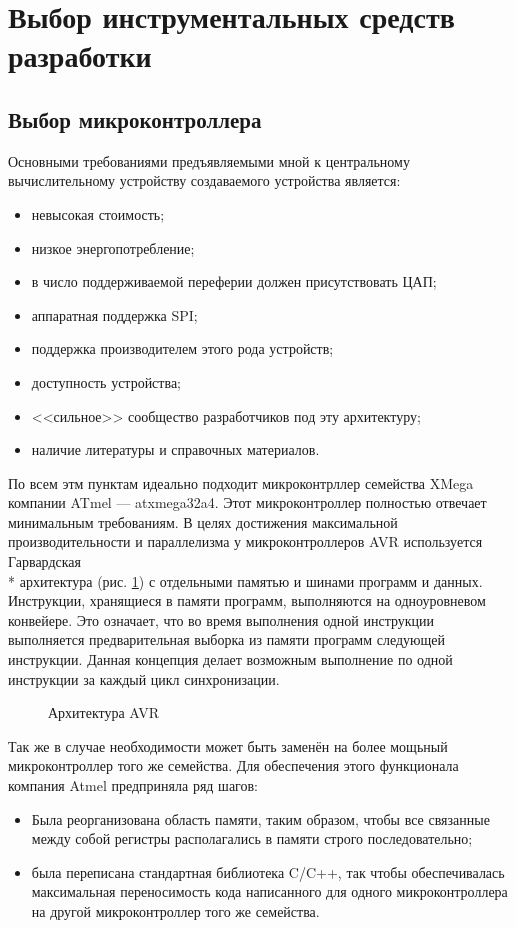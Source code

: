 \section{Выбор инструментальных средств разработки}

\subsection{Выбор микроконтроллера}
Основными требованиями предъявляемыми мной к центральному вычислительному устройству
создаваемого устройства является:
\begin{itemize}
	\item{} невысокая стоимость;
	\item{} низкое энергопотребление;
	\item{} в число поддерживаемой переферии должен присутствовать ЦАП;
	\item{} аппаратная поддержка SPI;
	\item{} поддержка производителем этого рода устройств;
	\item{} доступность устройства;
	\item{} <<сильное>> сообщество разработчиков под эту архитектуру;
	\item{} наличие литературы и справочных материалов.
\end{itemize}


По всем этм пунктам идеально подходит микроконтрллер семейства XMega компании ATmel --- atxmega32a4.
Этот микроконтроллер полностью отвечает минимальным требованиям. В целях достижения максимальной
производительности и параллелизма у микроконтроллеров AVR используется
Гарвардская\\*
архитектура (рис. \ref{img:avr_arch}) с отдельными памятью и шинами программ и данных. Инструкции,
хранящиеся в памяти программ, выполняются на одноуровневом конвейере. Это означает, что
во время выполнения одной инструкции выполняется предварительная выборка из памяти программ
следующей инструкции. Данная концепция делает возможным выполнение по одной инструкции за
каждый цикл синхронизации.

\begin{figure}[ht]
	\caption{Архитектура AVR}
	\label{img:avr_arch}
\end{figure}


Так же в случае необходимости может быть заменён на более мощьный микроконтроллер того же семейства.
Для обеспечения этого функционала компания Atmel предприняла ряд шагов:
\begin{itemize}
    \item{} Была реорганизована область памяти, таким образом, чтобы все связанные между
            собой регистры располагались в памяти строго последовательно;
    \item{} была переписана стандартная библиотека C/C++, так чтобы обеспечивалась
            максимальная переносимость кода написанного для одного микроконтроллера
            на другой микроконтроллер того же семейства.
\end{itemize}

